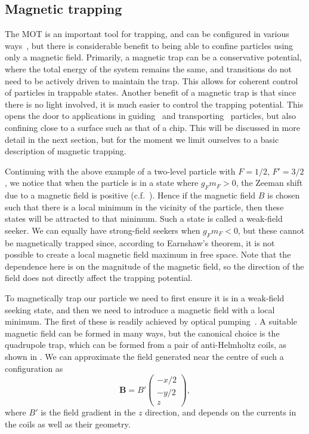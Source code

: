 \subsection{Magnetic trapping}
\label{theory:magtraps}

The MOT is an important tool for trapping, and can be configured in various
ways~\cite{Cotter2016, Lee:96, PhysRevLett.59.2631}, but there is considerable
benefit to being able to confine particles using only a magnetic field.
%
Primarily, a magnetic trap can be a conservative potential, where the total
energy of the system remains the same, and transitions do not need to be
actively driven to maintain the trap. This allows for coherent control of
particles in trappable states.
%
Another benefit of a magnetic trap is that since there is no light involved, it
is much easier to control the trapping potential. This opens the door to
applications in guiding~\cite{PhysRevLett.83.5194} and
transporting~\cite{Nakagawa2005} particles, but also confining close to a
surface such as that of a chip. This will be discussed in more detail in the
next section, but for the moment we limit ourselves to a basic description of
magnetic trapping.

Continuing with the above example of a two-level particle with $F=1/2$,
$F'=3/2$, we notice that when the particle is in a state where $g_F m_F > 0$,
the Zeeman shift due to a magnetic field is positive (c.f.\
). Hence if the magnetic field $B$ is chosen such
that there is a local minimum in the vicinity of the particle, then these
states will be attracted to that minimum. Such a state is called a weak-field
seeker. We can equally have strong-field seekers when $g_F m_F < 0$, but these
cannot be magnetically trapped since, according to Earnshaw's theorem, it is
not possible to create a local magnetic field maximum in free space.
%
Note that the dependence here is on the magnitude of the magnetic field, so the
direction of the field does not directly affect the trapping potential.

To magnetically trap our particle we need to first ensure it is in a weak-field
seeking state, and then we need to introduce a magnetic field with a local
minimum. The first of these is readily achieved by optical
pumping~\cite{PhysRevLett.54.2596}.  A suitable magnetic field can be formed in
many ways, but the canonical choice is the quadrupole trap, which can be formed
from a pair of anti-Helmholtz coils, as shown in
. We can approximate the field generated near
the centre of such a configuration as~\cite{Metcalf1999}
%
\begin{equation}
  \mathbf{B} = B'\begin{pmatrix} -x/2 \\ -y/2 \\ z \end{pmatrix},
  \label{theory:eqn:quadrupole}
\end{equation}
%
where $B'$ is the field gradient in the $z$ direction, and depends on the
currents in the coils as well as their geometry.

